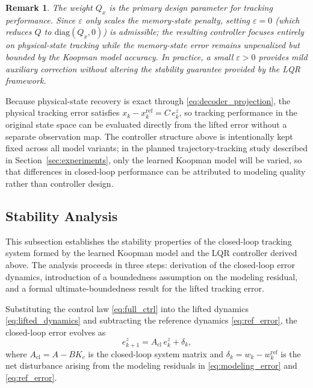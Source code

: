 \documentclass[journal]{IEEEtran}
\newtheorem{remark}{Remark}
\begin{document}
\begin{remark}
The weight $Q_x$ is the primary design parameter for tracking performance.
Since $\varepsilon$ only scales the memory-state penalty, setting
$\varepsilon = 0$ (which reduces $Q$ to $\mathrm{diag}(Q_x, 0)$) is
admissible; the resulting controller focuses entirely on physical-state
tracking while the memory-state error remains unpenalized but bounded by
the Koopman model accuracy. In practice, a small $\varepsilon > 0$ provides
mild auxiliary correction without altering the stability guarantee provided
by the LQR framework.
\end{remark}

Because physical-state recovery is exact through \eqref{eq:decoder_projection}, the physical tracking error satisfies $x_k - x_k^{\mathrm{ref}} = C\,e_k^z$, so tracking performance in the original state space can be evaluated directly from the lifted error without a separate observation map. The controller structure above is intentionally kept fixed across all model variants; in the planned trajectory-tracking study described in Section~\ref{sec:experiments}, only the learned Koopman model will be varied, so that differences in closed-loop performance can be attributed to modeling quality rather than controller design.

\subsection{Stability Analysis}
\label{subsec:stability}

This subsection establishes the stability properties of the closed-loop tracking system formed by the learned Koopman model and the LQR controller derived above. The analysis proceeds in three steps: derivation of the closed-loop error dynamics, introduction of a boundedness assumption on the modeling residual, and a formal ultimate-boundedness result for the lifted tracking error.

Substituting the control law \eqref{eq:full_ctrl} into the lifted dynamics \eqref{eq:lifted_dynamics} and subtracting the reference dynamics \eqref{eq:ref_error}, the closed-loop error evolves as
\begin{equation}
    e_{k+1}^z = A_{\mathrm{cl}}\, e_k^z + \delta_k,
    \label{eq:cl_error_dyn}
\end{equation}
where $A_{\mathrm{cl}} = A - BK_c$ is the closed-loop system matrix and $\delta_k = w_k - w_k^{\mathrm{ref}}$ is the net disturbance arising from the modeling residuals in \eqref{eq:modeling_error} and \eqref{eq:ref_error}.
\end{document}
